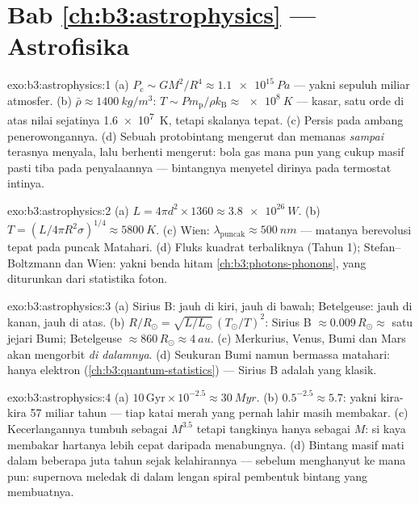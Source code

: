 \section*{Bab \ref{ch:b3:astrophysics} --- Astrofisika}

\begin{solution}{exo:b3:astrophysics:1}
(a) $P_{\text{c}} \sim GM^2/R^4 \approx \qty{1.1e15}{Pa}$ --- yakni sepuluh
miliar atmosfer. (b) $\bar\rho \approx \qty{1400}{kg/m^3}$:
$T \sim P m_{\text{p}}/\rho k_{\text{B}} \approx \qty{e8}{K}$ ---
kasar, satu orde di atas nilai sejatinya \qty{1.6e7}{K}, tetapi skalanya
tepat. (c) Persis pada ambang penerowongannya. (d) Sebuah protobintang
mengerut dan memanas \emph{sampai} terasnya menyala, lalu berhenti
mengerut: bola gas mana pun yang cukup masif pasti tiba pada penyalaannya
--- bintangnya menyetel dirinya pada termostat intinya.
\end{solution}

\begin{solution}{exo:b3:astrophysics:2}
(a) $L = 4\pi d^2\times1360 \approx \qty{3.8e26}{W}$. (b) $T =
(L/4\pi R^2\sigma)^{1/4} \approx \qty{5800}{K}$. (c) Wien:
$\lambda_{\text{puncak}} \approx \qty{500}{nm}$ --- matanya berevolusi
tepat pada puncak Matahari. (d) Fluks kuadrat terbaliknya (Tahun 1);
Stefan--Boltzmann dan Wien: yakni benda hitam \cref{ch:b3:photons-phonons},
yang diturunkan dari statistika foton.
\end{solution}

\begin{solution}{exo:b3:astrophysics:3}
(a) Sirius B: jauh di kiri, jauh di bawah; Betelgeuse: jauh di kanan, jauh di atas.
(b) $R/R_\odot = \sqrt{L/L_\odot}\,(T_\odot/T)^2$: Sirius B
$\approx 0.009\,R_\odot \approx$ satu jejari Bumi; Betelgeuse
$\approx 860\,R_\odot \approx \qty{4}{au}$. (c) Merkurius, Venus,
Bumi dan Mars akan mengorbit \emph{di dalamnya}. (d) Seukuran Bumi namun
bermassa matahari: hanya  elektron
(\cref{ch:b3:quantum-statistics}) --- Sirius B adalah
 yang klasik.
\end{solution}

\begin{solution}{exo:b3:astrophysics:4}
(a) $10\,\text{Gyr}\times10^{-2.5} \approx \qty{30}{Myr}$. (b)
$0.5^{-2.5} \approx 5.7$: yakni kira-kira 57 miliar tahun --- tiap katai
merah yang pernah lahir masih membakar. (c) Kecerlangannya tumbuh sebagai
$M^{3.5}$ tetapi tangkinya hanya sebagai $M$: si kaya membakar hartanya
lebih cepat daripada menabungnya. (d) Bintang masif mati dalam beberapa
juta tahun sejak kelahirannya --- sebelum menghanyut ke mana pun: supernova
meledak di dalam lengan spiral pembentuk bintang yang membuatnya.
\end{solution}

